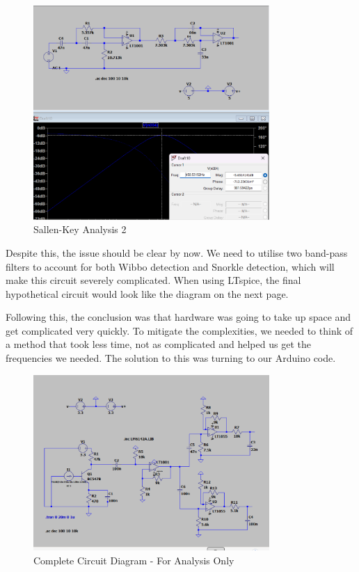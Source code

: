 \begin{figure}[h]
    \centering
    \includegraphics[width=0.8\textwidth]{subpages/images/sallen_key2.png}
    \caption{Sallen-Key Analysis 2}
    \label{fig:sallen_key2}
\end{figure}

Despite this, the issue should be clear by now. We need to utilise two band-pass filters to account for both Wibbo detection and Snorkle detection, which will make this circuit severely complicated. When using LTspice, the final hypothetical circuit would look like the diagram on the next page.

Following this, the conclusion was that hardware was going to take up space and get complicated very quickly. To mitigate the complexities, we needed to think of a method that took less time, not as complicated and helped us get the frequencies we needed. The solution to this was turning to our Arduino code.
\begin{figure}[H]
    \centering
    \includegraphics[width=0.8\textwidth]{subpages/images/ir_complex.png}
    \caption{Complete Circuit Diagram - For Analysis Only}
    \label{fig:complex_circuit}
\end{figure}

